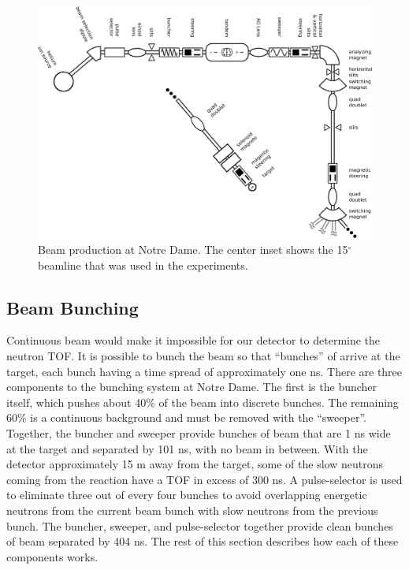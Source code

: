 \begin{figure}[htp]
\centering
\includegraphics[width=1.0\textwidth]{figures/NSL_beamline.eps}
\caption[Beam production at Notre Dame.]{Beam production at Notre Dame.  The center inset shows the 15$^{\circ}$ beamline that was used in the experiments.}
\label{fig:beamline}
\end{figure}

\subsection{Beam Bunching}

Continuous beam would make it impossible for our detector to determine the neutron TOF.  It is possible to bunch the beam so that ``bunches'' of  arrive at the target, each bunch having a time spread of approximately one ns. There are three components to the bunching system at Notre Dame.  The first is the buncher itself, which pushes about 40\% of the beam into discrete bunches.  The remaining 60\% is a continuous background and must be removed with the ``sweeper''.  Together, the buncher and sweeper provide bunches of beam that are 1 ns wide at the target and separated by 101 ns, with no beam in between.  With the detector approximately 15 m away from the target, some of the slow neutrons coming from the reaction have a TOF in excess of 300 ns.  A pulse-selector is used to eliminate three out of every four bunches to avoid overlapping energetic neutrons from the current beam bunch with slow neutrons from the previous bunch.  The buncher, sweeper, and pulse-selector together provide clean bunches of beam separated by 404 ns.  The rest of this section describes how each of these components works.


